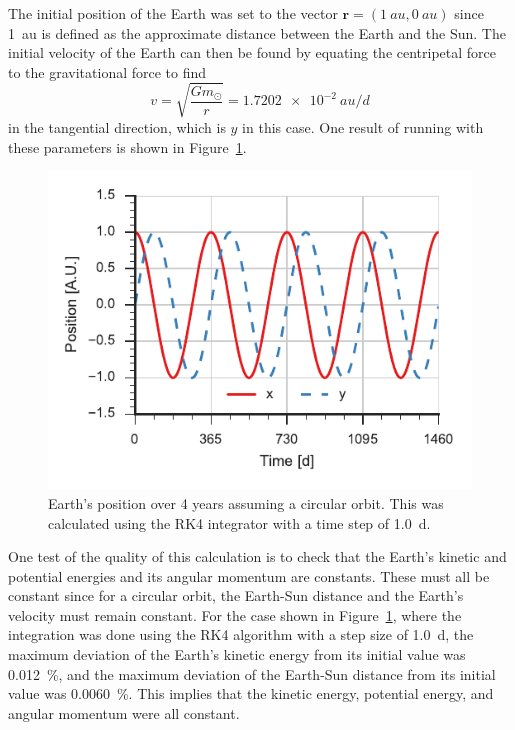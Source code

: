 \documentclass[aps,prc,reprint,nobalancelastpage]{revtex4-1}
\newcommand{\sun}[0]{\ensuremath{\odot}}
\begin{document}
        The initial position of the Earth was set to the vector $\mathbf{r} = (\SI{1}{au}, \SI{0}{au})$ since \SI{1}{au} is defined as the approximate distance between the Earth and the Sun. The initial velocity of the Earth can then be found by equating the centripetal force to the gravitational force to find
        \begin{equation}
            v = \sqrt{\frac{G m_\sun}{r}} = \SI{1.7202e-2}{au/d}
        \end{equation}
        in the tangential direction, which is $y$ in this case. One result of running with these parameters is shown in Figure~\ref{fig:earthrk4}.

        \begin{figure}
            \includegraphics{earthpos_rk4.pdf}
            \caption{Earth's position over 4 years assuming a circular orbit. This was calculated using the RK4 integrator with a time step of \SI{1.0}{d}.}
            \label{fig:earthrk4}
        \end{figure}

        One test of the quality of this calculation is to check that the Earth's kinetic and potential energies and its angular momentum are constants. These must all be constant since for a circular orbit, the Earth-Sun distance and the Earth's velocity must remain constant. For the case shown in Figure~\ref{fig:earthrk4}, where the integration was done using the RK4 algorithm with a step size of \SI{1.0}{d}, the maximum deviation of the Earth's kinetic energy from its initial value was \SI{0.012}{\percent}, and the maximum deviation of the Earth-Sun distance from its initial value was \SI{0.0060}{\percent}. This implies that the kinetic energy, potential energy, and angular momentum were all constant.
\end{document}

